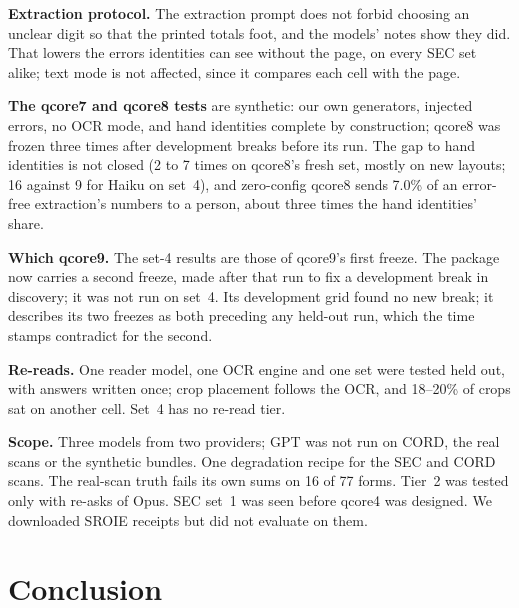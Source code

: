 \documentclass[10pt,twocolumn]{article}
\newcommand{\vq}[1]{\textsf{qcore#1}}
\begin{document}
\textbf{Extraction protocol.} The extraction prompt does not forbid choosing an unclear digit so that the printed totals foot, and the models' notes show they did. That lowers the errors identities can see without the page, on every SEC set alike; text mode is not affected, since it compares each cell with the page.

\textbf{The \vq{7} and \vq{8} tests} are synthetic: our own generators, injected errors, no OCR mode, and hand identities complete by construction; \vq{8} was frozen three times after development breaks before its run. The gap to hand identities is not closed (2 to 7 times on \vq{8}'s fresh set, mostly on new layouts; 16 against 9 for Haiku on set~4), and zero-config \vq{8} sends 7.0\% of an error-free extraction's numbers to a person, about three times the hand identities' share.

\textbf{Which \vq{9}.} The set-4 results are those of \vq{9}'s first freeze. The package now carries a second freeze, made after that run to fix a development break in discovery; it was not run on set~4. Its development grid found no new break; it describes its two freezes as both preceding any held-out run, which the time stamps contradict for the second.

\textbf{Re-reads.} One reader model, one OCR engine and one set were tested held out, with answers written once; crop placement follows the OCR, and 18--20\% of crops sat on another cell. Set~4 has no re-read tier.

\textbf{Scope.} Three models from two providers; GPT was not run on CORD, the real scans or the synthetic bundles. One degradation recipe for the SEC and CORD scans. The real-scan truth fails its own sums on 16 of 77 forms. Tier~2 was tested only with re-asks of Opus. SEC set~1 was seen before \vq{4} was designed. We downloaded SROIE receipts but did not evaluate on them.

\section{Conclusion}
\end{document}
